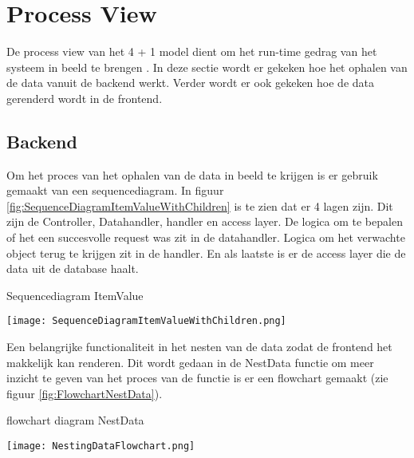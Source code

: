 \section{Process View}
De process view van het 4 + 1 model dient om het run-time gedrag van het systeem in beeld te brengen \parencite{4+1ViewModelPaper}.
In deze sectie wordt er gekeken hoe het ophalen van de data vanuit de backend werkt.
Verder wordt er ook gekeken hoe de data gerenderd wordt in de frontend.

\subsection{Backend}
Om het proces van het ophalen van de data in beeld te krijgen is er gebruik gemaakt van een sequencediagram.
In figuur \ref{fig:SequenceDiagramItemValueWithChildren} is te zien dat er 4 lagen zijn. 
Dit zijn de Controller, Datahandler, handler en access layer.
De logica om te bepalen of het een succesvolle request was zit in de datahandler.
Logica om het verwachte object terug te krijgen zit in de handler.
En als laatste is er de access layer die de data uit de database haalt.

\whitespace
\begin{graphic}
    \captionsetup{type=figure}
    \caption{Sequencediagram ItemValue}
    \texttt{[image: SequenceDiagramItemValueWithChildren.png]}
    \label{fig:SequenceDiagramItemValueWithChildren}
\end{graphic}

\whitespace
Een belangrijke functionaliteit in het nesten van de data zodat de frontend het makkelijk kan renderen.
Dit wordt gedaan in de NestData functie om meer inzicht te geven van het proces van de functie is er een flowchart gemaakt (zie figuur \ref{fig:FlowchartNestData}).

\whitespace[2]
\begin{graphic}
    \captionsetup{type=figure}
    \caption{flowchart diagram NestData}
    \texttt{[image: NestingDataFlowchart.png]}
    \label{fig:FlowchartNestData}
\end{graphic}


